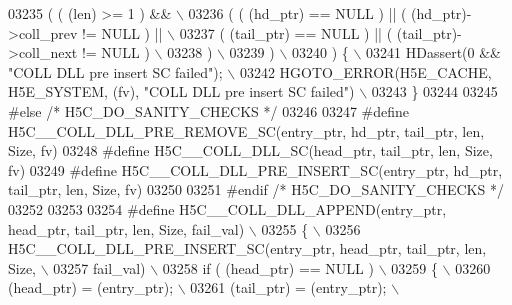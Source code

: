 \begin{DoxyCode}
03235 \textcolor{preprocessor}{     ( ( (len) >= 1 ) &&                                                       \(\backslash\)}
03236 \textcolor{preprocessor}{       ( ( (hd\_ptr) == NULL ) || ( (hd\_ptr)->coll\_prev != NULL ) ||            \(\backslash\)}
03237 \textcolor{preprocessor}{         ( (tail\_ptr) == NULL ) || ( (tail\_ptr)->coll\_next != NULL )           \(\backslash\)}
03238 \textcolor{preprocessor}{       )                                                                       \(\backslash\)}
03239 \textcolor{preprocessor}{     )                                                                         \(\backslash\)}
03240 \textcolor{preprocessor}{   ) \{                                                                         \(\backslash\)}
03241 \textcolor{preprocessor}{    HDassert(0 && "COLL DLL pre insert SC failed");                            \(\backslash\)}
03242 \textcolor{preprocessor}{    HGOTO\_ERROR(H5E\_CACHE, H5E\_SYSTEM, (fv), "COLL DLL pre insert SC failed")  \(\backslash\)}
03243 \textcolor{preprocessor}{\}}
03244 
03245 \textcolor{preprocessor}{#else }\textcolor{comment}{/* H5C\_DO\_SANITY\_CHECKS */}\textcolor{preprocessor}{}
03246 
03247 \textcolor{preprocessor}{#define H5C\_\_COLL\_DLL\_PRE\_REMOVE\_SC(entry\_ptr, hd\_ptr, tail\_ptr, len, Size, fv)}
03248 \textcolor{preprocessor}{#define H5C\_\_COLL\_DLL\_SC(head\_ptr, tail\_ptr, len, Size, fv)}
03249 \textcolor{preprocessor}{#define H5C\_\_COLL\_DLL\_PRE\_INSERT\_SC(entry\_ptr, hd\_ptr, tail\_ptr, len, Size, fv)}
03250 
03251 \textcolor{preprocessor}{#endif }\textcolor{comment}{/* H5C\_DO\_SANITY\_CHECKS */}\textcolor{preprocessor}{}
03252 
03253 
03254 \textcolor{preprocessor}{#define H5C\_\_COLL\_DLL\_APPEND(entry\_ptr, head\_ptr, tail\_ptr, len, Size, fail\_val) \(\backslash\)}
03255 \textcolor{preprocessor}{\{                                                                            \(\backslash\)}
03256 \textcolor{preprocessor}{    H5C\_\_COLL\_DLL\_PRE\_INSERT\_SC(entry\_ptr, head\_ptr, tail\_ptr, len, Size,    \(\backslash\)}
03257 \textcolor{preprocessor}{                               fail\_val)                                     \(\backslash\)}
03258 \textcolor{preprocessor}{    if ( (head\_ptr) == NULL )                                                \(\backslash\)}
03259 \textcolor{preprocessor}{    \{                                                                        \(\backslash\)}
03260 \textcolor{preprocessor}{       (head\_ptr) = (entry\_ptr);                                             \(\backslash\)}
03261 \textcolor{preprocessor}{       (tail\_ptr) = (entry\_ptr);                                             \(\backslash\)}

\end{DoxyCode}
